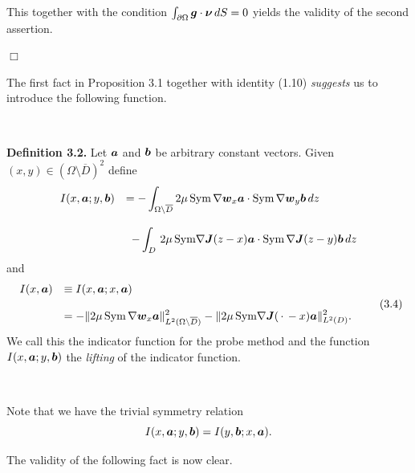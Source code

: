 This together with the condition $\int_{\partial\Omega}\mbox{\boldmath $g$}\cdot\mbox{\boldmath $\nu$}\,dS=0$ yields the validity of the second assertion.


\noindent
$\Box$






The first fact in Proposition 3.1 together with identity (1.10) {\it suggests} us to introduce the following function.



$\quad$

{\bf\noindent Definition 3.2.}  Let $\mbox{\boldmath $a$}$ and $\mbox{\boldmath $b$}$ be arbitrary constant vectors.
Given $(x,y)\in(\Omega\setminus\overline{D})^2$ define
$$\begin{array}{ll}
\displaystyle
I(x,\mbox{\boldmath $a$};y,\mbox{\boldmath $b$})
&
\displaystyle
=-\int_{\Omega\setminus\overline{D}}
2\mu\,\text{Sym}\,\nabla\mbox{\boldmath $w$}_x\mbox{\boldmath $a$}
\cdot
\text{Sym}\,\nabla\mbox{\boldmath $w$}_y\mbox{\boldmath $b$}\,dz
\\
\\
\displaystyle
&
\displaystyle
\,\,\,
-\int_D\,2\mu\,\text{Sym}\nabla\mbox{\boldmath $J$}(z-x)\mbox{\boldmath $a$}\cdot\text{Sym}\,\nabla\mbox{\boldmath $J$}(z-y)\mbox{\boldmath $b$}\,dz
\end{array}
$$
and
$$\begin{array}{ll}
\displaystyle
I(x,\mbox{\boldmath $a$})
&
\displaystyle
\equiv I(x,\mbox{\boldmath $a$};x,\mbox{\boldmath $a$})
\\
\\
\displaystyle
&
\displaystyle
=-\Vert 2\mu\,\text{Sym}\,\nabla\mbox{\boldmath $w$}_x\mbox{\boldmath $a$}\Vert_{L^2(\Omega\setminus\overline{D})}^2
-\Vert 2\mu\,\text{Sym}\nabla\mbox{\boldmath $J$}(\,\cdot\,-x)\mbox{\boldmath $a$}\Vert_{L^2(D)}^2.
\end{array}
\tag {3.4}
$$
We call this the indicator function for the probe method and the function $I(x,\mbox{\boldmath $a$};y,\mbox{\boldmath $b$})$ the {\it lifting} of the indicator function.



$\quad$

Note that we have the trivial symmetry relation
$$\displaystyle
I(x,\mbox{\boldmath $a$};y,\mbox{\boldmath $b$})
=I(y,\mbox{\boldmath $b$};x,\mbox{\boldmath $a$}).
$$




The validity of  the following fact is now clear.


